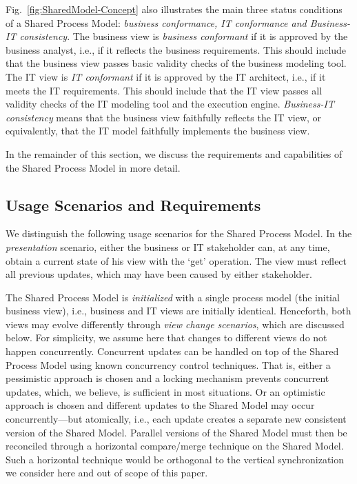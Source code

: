 Fig.~\ref{fig:SharedModel-Concept} also illustrates the main three status conditions of a Shared Process Model: \emph{business conformance, IT conformance and Business-IT consistency}. The business view is \emph{business conformant} if it is approved by the business analyst, i.e., if it reflects the business requirements. This should include that the business view passes basic validity checks of the business modeling tool. The IT view is \emph{IT conformant} if it is approved by the IT architect, i.e., if it meets the IT requirements. This should include that the IT view passes all validity checks of the IT modeling tool and the execution engine. \emph{Business-IT consistency} means that the business view faithfully reflects the IT view, or equivalently, that the IT model faithfully implements the business view. 

In the remainder of this section, we discuss the requirements and capabilities of the Shared Process Model in more detail.



\subsection{Usage Scenarios and Requirements}
\label{sec:requirements2}

We distinguish the following usage scenarios for the Shared Process Model. In the \emph{presentation} scenario, either the business or IT stakeholder can, at any time, obtain a current state of his view with the `get' operation. The view must reflect all previous updates, which may have been caused by either stakeholder.

The Shared Process Model is \emph{initialized} with a single process model (the initial business view), i.e., business and IT views are initially identical. Henceforth, both views may evolve differently through \emph{view change scenarios}, which are discussed below.
For simplicity, we assume here that changes to different views do not happen concurrently. Concurrent updates can be handled on top of the Shared Process Model using known concurrency control techniques. That is, either a pessimistic approach is chosen and a locking mechanism prevents concurrent updates, which, we believe, is sufficient in most situations. Or an optimistic approach is chosen and different updates to the Shared Model may occur concurrently---but atomically, i.e., each update creates a separate new consistent version of the Shared Model. Parallel versions of the Shared Model must then be reconciled through a horizontal compare/merge technique on the Shared Model. Such a horizontal technique would be orthogonal to the vertical synchronization we consider here and out of scope of this paper.


